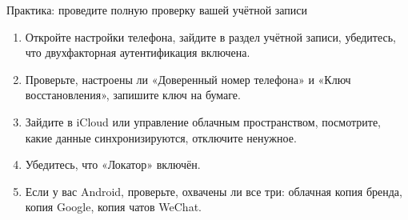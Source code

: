 \begin{tcbpractice}{Практика: проведите полную проверку вашей учётной записи}
\begin{enumerate}
  \item Откройте настройки телефона, зайдите в раздел учётной записи, убедитесь, что двухфакторная аутентификация включена.
  \item Проверьте, настроены ли «Доверенный номер телефона» и «Ключ восстановления», запишите ключ на бумаге.
  \item Зайдите в iCloud или управление облачным пространством, посмотрите, какие данные синхронизируются, отключите ненужное.
  \item Убедитесь, что «Локатор» включён.
  \item Если у вас Android, проверьте, охвачены ли все три: облачная копия бренда, копия Google, копия чатов WeChat.
\end{enumerate}

\end{tcbpractice}
